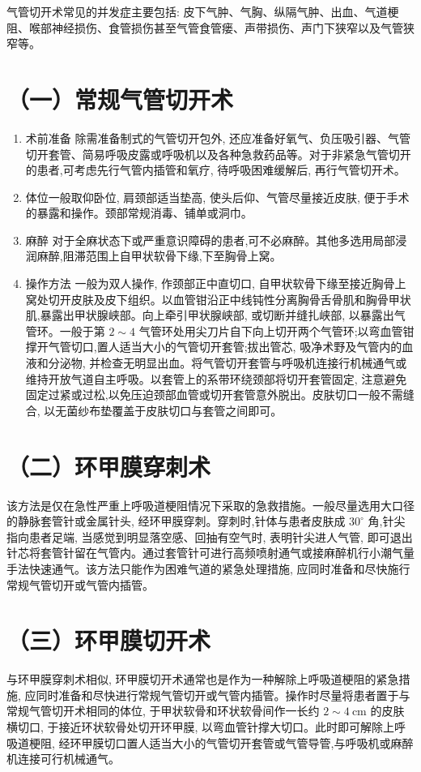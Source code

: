\documentclass[10pt]{article}
\begin{document}
气管切开术常见的并发症主要包括: 皮下气肿、气胸、纵隔气肿、出血、气道梗阻、喉部神经损伤、食管损伤甚至气管食管瘘、声带损伤、声门下狭窄以及气管狭窄等。

\section*{（一）常规气管切开术}
\begin{enumerate}
  \item 术前准备 除需准备制式的气管切开包外, 还应准备好氧气、负压吸引器、气管切开套管、简易呼吸皮露或呼吸机以及各种急救药品等。对于非紧急气管切开的患者,可考虑先行气管内插管和氧疗, 待呼吸困难缓解后, 再行气管切开术。

  \item 体位一般取仰卧位, 肩颈部适当垫高, 使头后仰、气管尽量接近皮肤, 便于手术的暴露和操作。颈部常规消毒、铺单或洞巾。

  \item 麻醉 对于全麻状态下或严重意识障碍的患者,可不必麻醉。其他多选用局部浸润麻醉,阻滞范围上自甲状软骨下缘,下至胸骨上窝。

  \item 操作方法 一般为双人操作, 作颈部正中直切口, 自甲状软骨下缘至接近胸骨上窝处切开皮肤及皮下组织。以血管钳沿正中线钝性分离胸骨舌骨肌和胸骨甲状肌,暴露出甲状腺峡部。向上牵引甲状腺峡部, 或切断并缝扎峡部, 以暴露出气管环。一般于第 $2 \sim 4$ 气管环处用尖刀片自下向上切开两个气管环;以弯血管钳撑开气管切口,置人适当大小的气管切开套管;拔出管芯, 吸净术野及气管内的血液和分泌物, 并检查无明显出血。将气管切开套管与呼吸机连接行机械通气或维持开放气道自主呼吸。以套管上的系带环绕颈部将切开套管固定, 注意避免固定过紧或过松,以免压迫颈部血管或切开套管意外脱出。皮肤切口一般不需缝合, 以无菌纱布垫覆盖于皮肤切口与套管之间即可。

\end{enumerate}

\section*{（二）环甲膜穿刺术}
该方法是仅在急性严重上呼吸道梗阻情况下采取的急救措施。一般尽量选用大口径的静脉套管针或金属针头, 经环甲膜穿刺。穿刺时,针体与患者皮肤成 $30^{\circ}$ 角,针尖指向患者足端, 当感觉到明显落空感、回抽有空气时, 表明针尖进人气管, 即可退出针芯将套管针留在气管内。通过套管针可进行高频喷射通气或接麻醉机行小潮气量手法快速通气。该方法只能作为困难气道的紧急处理措施, 应同时准备和尽快施行常规气管切开或气管内插管。

\section*{（三）环甲膜切开术}
与环甲膜穿刺术相似, 环甲膜切开术通常也是作为一种解除上呼吸道梗阻的紧急措施, 应同时准备和尽快进行常规气管切开或气管内插管。操作时尽量将患者置于与常规气管切开术相同的体位, 于甲状软骨和环状软骨间作一长约 $2 \sim 4 \mathrm{~cm}$ 的皮肤横切口, 于接近环状软骨处切开环甲膜, 以弯血管针撑大切口。此时即可解除上呼吸道梗阻, 经环甲膜切口置人适当大小的气管切开套管或气管导管,与呼吸机或麻醉机连接可行机械通气。
\end{document}
